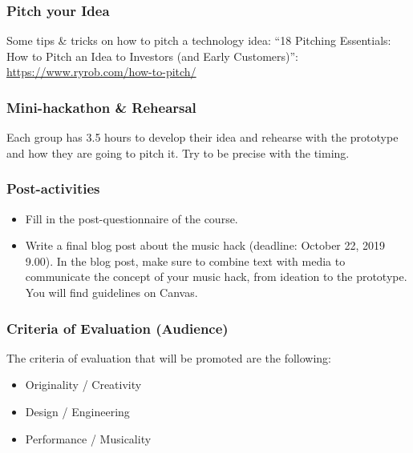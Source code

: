 \documentclass[screen, aspectratio=169]{beamer}
\begin{document}
%
\begin{frame}
\frametitle{Pitch your Idea}
Some tips \& tricks on how to pitch a technology idea: ``18 Pitching Essentials: How to Pitch an Idea to Investors (and Early Customers)'': \url{https://www.ryrob.com/how-to-pitch/}
\end{frame}%
%
\begin{frame}
  \frametitle{Mini-hackathon \& Rehearsal}
  Each group has 3.5 hours to develop their idea and rehearse with the prototype and how they are going to pitch it. Try to be precise with the timing.
\end{frame}
%
\begin{frame}
  \frametitle{Post-activities}
    \begin{itemize}
         \item Fill in the post-questionnaire of the course.
    	\item Write a final blog post about the music hack (deadline: October 22, 2019 9.00). In the blog post, make sure to combine text with media to communicate the concept of your music hack, from ideation to the prototype. You will find guidelines on Canvas.
    \end{itemize}
\end{frame}
%
\begin{frame}
  \frametitle{Criteria of Evaluation (Audience)}
  The criteria of evaluation that will be promoted are the following:
    \begin{itemize}
    	\item Originality / Creativity
	\item Design / Engineering
	\item Performance / Musicality
    \end{itemize}
\end{frame}
%
\end{document}
